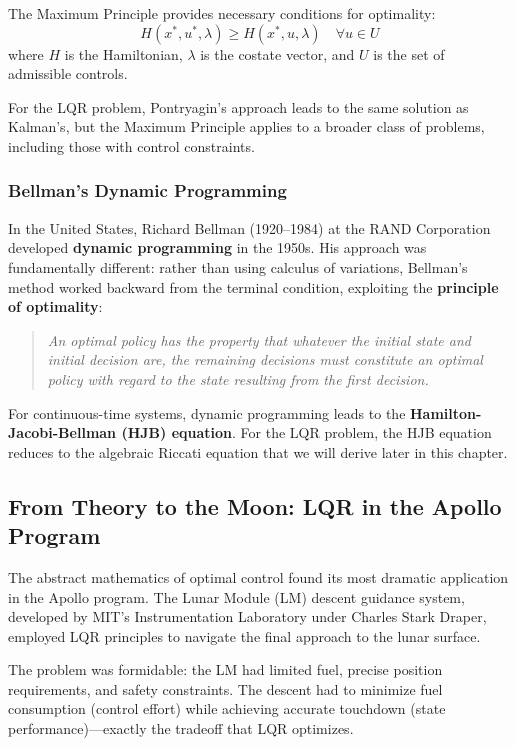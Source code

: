 The Maximum Principle provides necessary conditions for optimality:
\begin{equation}
H(x^*, u^*, \lambda) \geq H(x^*, u, \lambda) \quad \forall u \in U
\end{equation}
where $H$ is the Hamiltonian, $\lambda$ is the costate vector, and $U$ is the set of admissible controls.

For the LQR problem, Pontryagin's approach leads to the same solution as Kalman's, but the Maximum Principle applies to a broader class of problems, including those with control constraints.

\subsubsection{Bellman's Dynamic Programming}

In the United States, Richard Bellman (1920--1984) at the RAND Corporation developed \textbf{dynamic programming} in the 1950s. His approach was fundamentally different: rather than using calculus of variations, Bellman's method worked backward from the terminal condition, exploiting the \textbf{principle of optimality}:

\begin{quote}
\textit{An optimal policy has the property that whatever the initial state and initial decision are, the remaining decisions must constitute an optimal policy with regard to the state resulting from the first decision.}
\end{quote}

For continuous-time systems, dynamic programming leads to the \textbf{Hamilton-Jacobi-Bellman (HJB) equation}. For the LQR problem, the HJB equation reduces to the algebraic Riccati equation that we will derive later in this chapter.

\subsection{From Theory to the Moon: LQR in the Apollo Program}

The abstract mathematics of optimal control found its most dramatic application in the Apollo program. The Lunar Module (LM) descent guidance system, developed by MIT's Instrumentation Laboratory under Charles Stark Draper, employed LQR principles to navigate the final approach to the lunar surface.

The problem was formidable: the LM had limited fuel, precise position requirements, and safety constraints. The descent had to minimize fuel consumption (control effort) while achieving accurate touchdown (state performance)---exactly the tradeoff that LQR optimizes.

